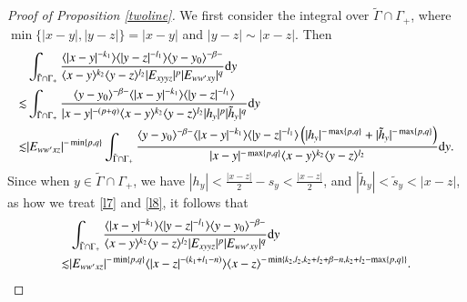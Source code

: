 \documentclass[11pt,reqno]{amsart}
\def\d{{\rm d}}
\numberwithin{equation}{section}
\theoremstyle{definition}
\begin{document}
\begin{appendix}
\begin{proof}[Proof of Proposition \ref{twoline}]
		We first consider the integral over $\tilde{\Gamma}\cap\Gamma_+$, where $\min\{|x-y|,|y-z|\}=|x-y|$ and $|y-z|\sim|x-z|$. Then
		\begin{equation*}
			\begin{split}
				&\int_{\tilde{\Gamma}\cap\Gamma_+}\frac{\langle|x-y|^{-k_1}\rangle\langle|y-z|^{-l_1}\rangle\langle y-y_0\rangle^{-\beta-}}{\langle x-y\rangle^{k_2}\langle y-z\rangle^{l_2}|E_{xyyz}|^p|E_{ww'xy}|^q}\d y\\
				\lesssim&\int_{\tilde{\Gamma}\cap\Gamma_+}\frac{\langle y-y_0\rangle^{-\beta-}\langle|x-y|^{-k_1}\rangle\langle|y-z|^{-l_1}\rangle}{|x-y|^{-(p+q)}\langle x-y\rangle^{k_2}\langle y-z\rangle^{l_2}|h_y|^p|\tilde{h}_y|^q}\d y\\
				\lesssim&|E_{ww'xz}|^{-\min\{p,q\}}\int_{\tilde{\Gamma}\cap\Gamma_+}\frac{\langle y-y_0\rangle^{-\beta-}\langle|x-y|^{-k_1}\rangle\langle|y-z|^{-l_1}\rangle\left(|h_y|^{-\max\{p,q\}}+|\tilde{h}_y|^{-\max\{p,q\}}\right)}{|x-y|^{-\max\{p,q\}}\langle x-y\rangle^{k_2}\langle y-z\rangle^{l_2}}\d y.
			\end{split}
		\end{equation*}
		Since when $y\in\tilde{\Gamma}\cap\Gamma_+$, we have $|h_y|<\frac{|x-z|}{2}-s_y<\frac{|x-z|}{2}$, and $|\tilde{h}_y|<\tilde{s}_y<|x-z|$, as how we treat \eqref{l7} and \eqref{l8}, it follows that
		\begin{equation*}\label{l35}
			\begin{split}
				&\int_{\tilde{\Gamma}\cap\Gamma_+}\frac{\langle|x-y|^{-k_1}\rangle\langle|y-z|^{-l_1}\rangle\langle y-y_0\rangle^{-\beta-}}{\langle x-y\rangle^{k_2}\langle y-z\rangle^{l_2}|E_{xyyz}|^p|E_{ww'xy}|^q}\d y\\
				\lesssim&|E_{ww'xz}|^{-\min\{p,q\}}\langle|x-z|^{-(k_1+l_1-n)}\rangle\langle x-z\rangle^{-\min\{k_2,l_2,k_2+l_2+\beta-n,k_2+l_2-\max\{p,q\}\}}.
			\end{split}
		\end{equation*}
		

\end{proof}
\end{appendix}
\end{document}
